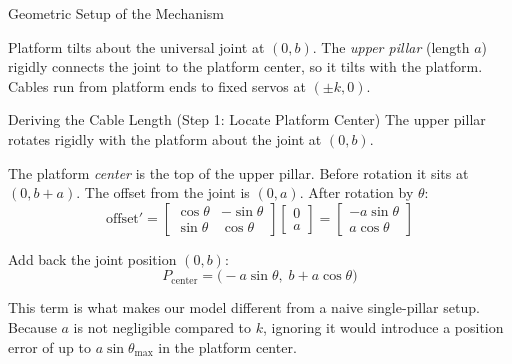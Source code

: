 \documentclass[10pt]{beamer}
\begin{document}
\begin{frame}{Geometric Setup of the Mechanism}
\begin{center}
{%
  }
  \end{center}
  \vspace{0.1cm}
  \scriptsize
  Platform tilts about the universal joint at $(0,b)$. The \emph{upper pillar} (length $a$) rigidly connects the joint to the platform center, so it tilts with the platform. Cables run from platform ends to fixed servos at $(\pm k, 0)$.
\end{frame}

\begin{frame}{Deriving the Cable Length (Step 1: Locate Platform Center)}
  The upper pillar rotates rigidly with the platform about the joint at $(0, b)$.

  The platform \emph{center} is the top of the upper pillar. Before rotation it sits at $(0, b+a)$. The offset from the joint is $(0, a)$. After rotation by $\theta$:
  \[
    \text{offset}' = \begin{bmatrix} \cos\theta & -\sin\theta \\ \sin\theta & \cos\theta \end{bmatrix} \begin{bmatrix} 0 \\ a \end{bmatrix}
    = \begin{bmatrix} -a\sin\theta \\ a\cos\theta \end{bmatrix}
  \]

  Add back the joint position $(0, b)$:
  \[
    \boxed{\;
      P_{\text{center}} = \bigl(-a\sin\theta,\; b + a\cos\theta\bigr)
    \;}
  \]

  \scriptsize
  This term is what makes our model different from a naive single-pillar setup. Because $a$ is not negligible compared to $k$, ignoring it would introduce a position error of up to $a\sin\theta_{\max}$ in the platform center.
\end{frame}
\end{document}
